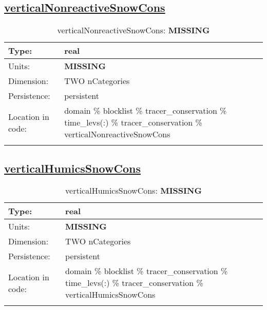 \subsection[verticalNonreactiveSnowCons]{\hyperref[sec:var_tab_tracer_conservation]{verticalNonreactiveSnowCons}}
\label{subsec:var_sec_tracer_conservation_verticalNonreactiveSnowCons}
\begin{center}
\begin{longtable}{| p{2.0in} | p{4.0in} |}
        \hline 
        Type: & real \\
        \hline 
        Units: & {\bf \color{red} MISSING} \\
        \hline 
        Dimension: & TWO nCategories \\
        \hline 
        Persistence: & persistent \\
        \hline 
         Location in code: & domain \% blocklist \% tracer\_conservation \% time\_levs(:) \% tracer\_conservation \% verticalNonreactiveSnowCons \\
         \hline 
    \caption{verticalNonreactiveSnowCons: {\bf \color{red} MISSING}}
\end{longtable}
\end{center}
\subsection[verticalHumicsSnowCons]{\hyperref[sec:var_tab_tracer_conservation]{verticalHumicsSnowCons}}
\label{subsec:var_sec_tracer_conservation_verticalHumicsSnowCons}
\begin{center}
\begin{longtable}{| p{2.0in} | p{4.0in} |}
        \hline 
        Type: & real \\
        \hline 
        Units: & {\bf \color{red} MISSING} \\
        \hline 
        Dimension: & TWO nCategories \\
        \hline 
        Persistence: & persistent \\
        \hline 
         Location in code: & domain \% blocklist \% tracer\_conservation \% time\_levs(:) \% tracer\_conservation \% verticalHumicsSnowCons \\
         \hline 
    \caption{verticalHumicsSnowCons: {\bf \color{red} MISSING}}
\end{longtable}
\end{center}
